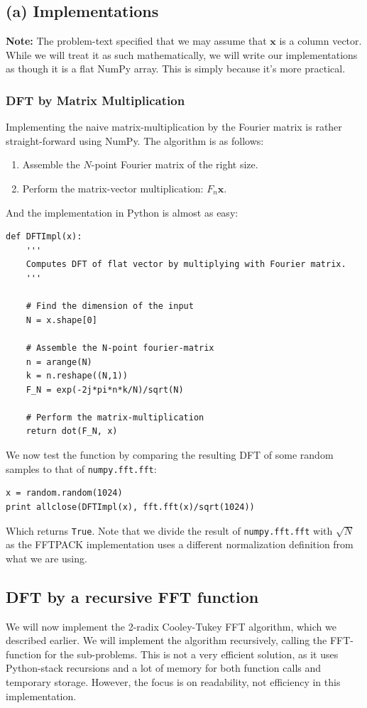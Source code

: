 \documentclass[a4paper, 11pt, notitlepage, english]{article}
\newcommand{\bt}[1]{\boldsymbol{#1}}
\begin{document}
\subsection*{(a) Implementations}
\textbf{Note:} The problem-text specified that we may assume that $\bt{x}$ is a column vector. While we will treat it as such mathematically, we will write our implementations as though it is a flat NumPy array. This is simply because it's more practical.


\subsubsection*{DFT by Matrix Multiplication}
Implementing the naive matrix-multiplication by the Fourier matrix is rather straight-forward using NumPy. The algorithm is as follows:
\begin{enumerate}
    \item Assemble the $N$-point Fourier matrix of the right size.
    \item Perform the matrix-vector multiplication: $F_n\bt{x}$.
\end{enumerate}
And the implementation in Python is almost as easy:
\begin{lstlisting}
def DFTImpl(x):
    '''
    Computes DFT of flat vector by multiplying with Fourier matrix.
    '''

    # Find the dimension of the input
    N = x.shape[0]

    # Assemble the N-point fourier-matrix
    n = arange(N)
    k = n.reshape((N,1))
    F_N = exp(-2j*pi*n*k/N)/sqrt(N)

    # Perform the matrix-multiplication
    return dot(F_N, x)
\end{lstlisting}
We now test the function by comparing the resulting DFT of some random samples to that of \verb+numpy.fft.fft+:
\begin{lstlisting}
x = random.random(1024)
print allclose(DFTImpl(x), fft.fft(x)/sqrt(1024))
\end{lstlisting}
Which returns \verb+True+. Note that we divide the result of \verb+numpy.fft.fft+ with $\sqrt{N}$ as the FFTPACK implementation uses a different normalization definition from what we are using.

\subsection*{DFT by a recursive FFT function}
We will now implement the 2-radix Cooley-Tukey FFT algorithm, which we described earlier. We will implement the algorithm recursively, calling the FFT-function for the sub-problems. This is not a very efficient solution, as it uses Python-stack recursions and a lot of memory for both function calls and temporary storage. However, the focus is on readability, not efficiency in this implementation.
\end{document}
